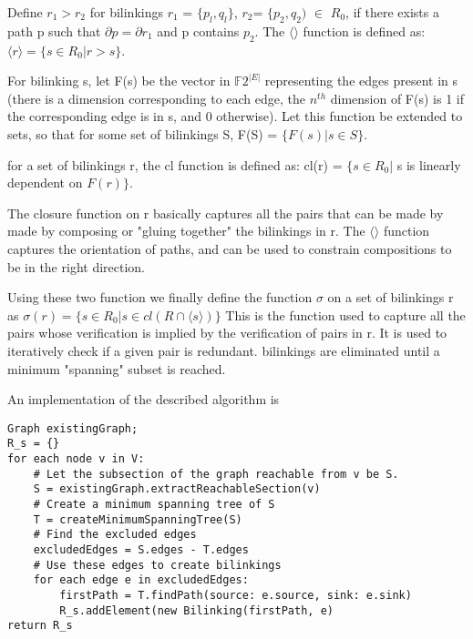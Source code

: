 \documentclass[runningheads]{llncs}
\begin{document}
Define $r_1>r_2$ for bilinkings $r_1$ = $\{p_l,q_l\}$, $r_2$= $\{p_2, q_2)$ $\in$ $R_0$, if there exists a path p such that $\partial p=\partial r_1$ and p contains $p_2$.
The $\langle\rangle$ function is defined as:
$\langle r \rangle = \{ s\in R_0| r>s\}$.

For bilinking s, let F(s) be the vector in $\mathbb{F}2^{|E|}$ representing the edges present in s (there is a dimension corresponding to each edge, the $n^{th}$ dimension of F(s) is 1 if the corresponding edge is in s, and 0 otherwise). Let this function be extended to sets, so that for some set of bilinkings S, F(S) = $\{ F(s) | s\in S \}$.

for a set of bilinkings r, the cl function is defined as:
cl(r) = $\{ s\in R_0|$ s is linearly dependent on $F(r) \}$.

The closure function on r basically captures all the pairs that can be made by made by composing or "gluing together" the bilinkings in r. The $\langle\rangle$ function captures the orientation of paths, and can be used to constrain compositions to be in the right direction. 

Using these two function we finally define the function $\sigma$ on a set of bilinkings r as
$\sigma(r) = \{s \in R_0 | s\in cl(R\cap \langle s \rangle) \}$
This is the function used to capture all the pairs whose verification is implied by the verification of pairs in r.
It is used to iteratively check if a given pair is redundant. bilinkings are eliminated until a minimum "spanning" subset is reached.

An implementation of the described algorithm is

\begin{verbatim}
Graph existingGraph;
R_s = {}
for each node v in V:
    # Let the subsection of the graph reachable from v be S.
    S = existingGraph.extractReachableSection(v)
    # Create a minimum spanning tree of S
    T = createMinimumSpanningTree(S)
    # Find the excluded edges
    excludedEdges = S.edges - T.edges
    # Use these edges to create bilinkings
    for each edge e in excludedEdges:
        firstPath = T.findPath(source: e.source, sink: e.sink)
        R_s.addElement(new Bilinking(firstPath, e)
return R_s
\end{verbatim}
\end{document}
